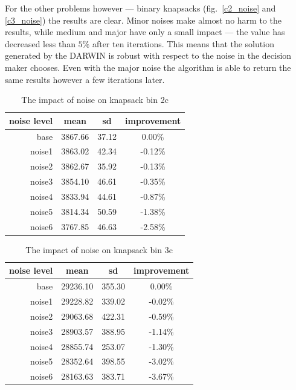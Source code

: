 For the other problems however --- binary knapsacks (fig.~\ref{c2_noise} and
\ref{c3_noise}) the results are clear. Minor noises make almost no harm to the
results, while medium and major have only a small impact --- the value has
decreased less than $5\%$ after ten iterations. This means that the solution
generated by the DARWIN is robust with respect to the noise in the decision
maker chooses. Even with the major noise the algorithm is able to return the
same results however a few iterations later.

\begin{table}[h]
  \centering
  \caption{The impact of noise on knapsack bin 2c}
  \label{t:noise1}
  \begin{tabular}{r c c c}
    \hline
    noise level & mean & sd & improvement\\
    \hline
    \hline
    base & 3867.66 & 37.12 & 0.00\% \\
    noise1 & 3863.02 & 42.34 & -0.12\% \\
    noise2 & 3862.67 & 35.92 & -0.13\% \\
    noise3 & 3854.10 & 46.61 & -0.35\% \\
    noise4 & 3833.94 & 44.61 & -0.87\% \\
    noise5 & 3814.34 & 50.59 & -1.38\% \\
    noise6 & 3767.85 & 46.63 & -2.58\% \\
    \hline
  \end{tabular}
\end{table}

\begin{table}[h]
  \centering
  \caption{The impact of noise on knapsack bin 3c}
  \label{t:noise2}
  \begin{tabular}{r c c c}
    \hline
    noise level & mean & sd & improvement\\
    \hline
    \hline
    base & 29236.10 & 355.30 & 0.00\% \\
    noise1 & 29228.82 & 339.02 & -0.02\% \\
    noise2 & 29063.68 & 422.31 & -0.59\% \\
    noise3 & 28903.57 & 388.95 & -1.14\% \\
    noise4 & 28855.74 & 253.07 & -1.30\% \\
    noise5 & 28352.64 & 398.55 & -3.02\% \\
    noise6 & 28163.63 & 383.71 & -3.67\% \\
    \hline
  \end{tabular}
\end{table}

